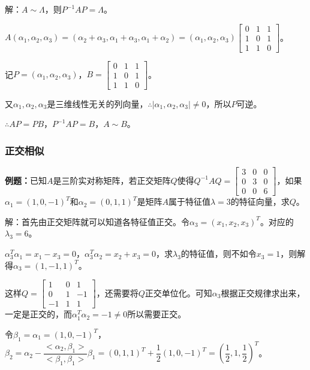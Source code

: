 \documentclass[UTF8, 12pt]{ctexart}
\begin{document}
解：$A\sim\Lambda$，则$P^{-1}AP=\Lambda$。

$A(\alpha_1,\alpha_2,\alpha_3)=(\alpha_2+\alpha_3,\alpha_1+\alpha_3,\alpha_1+\alpha_2)=(\alpha_1,\alpha_2,\alpha_3)\left[\begin{array}{ccc}
    0 & 1 & 1 \\
    1 & 0 & 1 \\
    1 & 1 & 0
\end{array}\right]$。

记$P=(\alpha_1,\alpha_2,\alpha_3)$，$B=\left[\begin{array}{ccc}
    0 & 1 & 1 \\
    1 & 0 & 1 \\
    1 & 1 & 0
\end{array}\right]$。\medskip

又$\alpha_1,\alpha_2,\alpha_3$是三维线性无关的列向量，$\therefore\vert\alpha_1,\alpha_2,\alpha_3\vert\neq0$，所以$P$可逆。

$\therefore AP=PB$，$P^{-1}AP=B$，$A\sim B$。

\subsubsection{正交相似}

\textbf{例题：}已知$A$是三阶实对称矩阵，若正交矩阵$Q$使得$Q^{-1}AQ=\left[\begin{array}{ccc}
    3 & 0 & 0 \\
    0 & 3 & 0 \\
    0 & 0 & 6
\end{array}\right]$，如果$\alpha_1=(1,0,-1)^T$和$\alpha_2=(0,1,1)^T$是矩阵$A$属于特征值$\lambda=3$的特征向量，求$Q$。

解：首先由正交矩阵就可以知道各特征值正交。令$\alpha_3=(x_1,x_2,x_3)^T$。对应的$\lambda_3=6$。

$\alpha_3^T\alpha_1=x_1-x_3=0$，$\alpha_3^T\alpha_2=x_2+x_3=0$，求$\lambda_3$的特征值，则不如令$x_3=1$，则解得$\alpha_3=(1,-1,1)^T$。

这样$Q=\left[\begin{array}{ccc}
    1 & 0 & 1 \\
    0 & 1 & -1 \\
    -1 & 1 & 1
\end{array}\right]$，还需要将$Q$正交单位化。可知$\alpha_3$根据正交规律求出来，一定是正交的，而$\alpha_1^T\alpha_2=-1\neq0$所以需要正交。

令$\beta_1=\alpha_1=(1,0,-1)^T$，$\beta_2=\alpha_2-\dfrac{<\alpha_2,\beta_1>}{<\beta_1,\beta_1>}\beta_1=(0,1,1)^T+\dfrac{1}{2}(1,0,-1)^T=(\dfrac{1}{2},1,\dfrac{1}{2})^T$。
\end{document}
